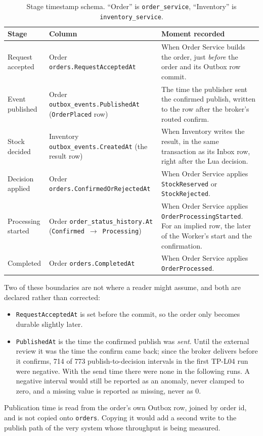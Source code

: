 \documentclass[a4paper]{report}
\begin{document}
\begin{table}[tbp]
\centering
\small
\caption{Stage timestamp schema. ``Order'' is \texttt{order\_service},
``Inventory'' is \texttt{inventory\_service}.}
\label{tab:timestamp-schema}
\begin{tabular}{>{\raggedright\arraybackslash}p{2.1cm}>{\raggedright\arraybackslash}p{4.9cm}>{\raggedright\arraybackslash}p{5.6cm}}
\toprule
Stage & Column & Moment recorded \\
\midrule
Request accepted & Order \texttt{orders.}\allowbreak\texttt{RequestAcceptedAt} & When Order
  Service builds the order, just \emph{before} the order and its Outbox row
  commit. \\
Event published & Order \texttt{outbox\_events.}\allowbreak\texttt{PublishedAt}
  (\texttt{OrderPlaced} row) & The time the publisher sent the confirmed publish, written to the row after the broker's routed confirm. \\
Stock decided & Inventory \texttt{outbox\_events.}\allowbreak\texttt{CreatedAt} (the result row)
  & When Inventory writes the result, in the same transaction as its Inbox
  row, right after the Lua decision. \\
Decision applied & Order \texttt{orders.}\allowbreak\texttt{ConfirmedOrRejectedAt} & When Order
  Service applies \texttt{StockReserved} or \texttt{StockRejected}. \\
Processing started & Order \texttt{order\_status\_history.}\allowbreak\texttt{At}
  (\texttt{Confirmed}~$\to$~\texttt{Processing}) & When Order Service
  applies \texttt{OrderProcessingStarted}. For an implied row, the later of
  the Worker's start and the confirmation. \\
Completed & Order \texttt{orders.}\allowbreak\texttt{CompletedAt} & When Order Service applies
  \texttt{OrderProcessed}. \\
\bottomrule
\end{tabular}
\end{table}

Two of these boundaries are not where a reader might assume, and both are
declared rather than corrected:
\begin{itemize}
  \item \texttt{RequestAcceptedAt} is set before the commit, so the order
    only becomes durable slightly later.
  \item \texttt{PublishedAt} is the time the confirmed publish was
    \emph{sent}. Until the external review it was the time the confirm
    came back; since the broker delivers before it confirms, 714 of 773
    publish-to-decision intervals in the first TP-L04 run were negative.
    With the send time there were none in the following runs. A negative
    interval would still be reported as an anomaly, never clamped to zero,
    and a missing value is reported as missing, never as 0.
\end{itemize}
Publication time is read from the order's own Outbox row, joined by order id,
and is not copied onto \texttt{orders}. Copying it would add a second write to
the publish path of the very system whose throughput is being measured.
\end{document}
